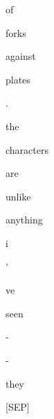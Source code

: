 \documentclass[varwidth=150mm]{standalone}
\begin{document}
\begin{CJK*}{UTF8}{gbsn}
{{{\colorbox{red!1.964485764503479}{\strut of} \colorbox{red!47.36729431152344}{\strut forks} \colorbox{red!2.4513847827911377}{\strut against} \colorbox{red!66.5539321899414}{\strut plates} \colorbox{red!0.0}{\strut .} \colorbox{red!4.719942092895508}{\strut the} \colorbox{red!12.691497802734375}{\strut characters} \colorbox{red!8.424782752990723}{\strut are} \colorbox{red!2.6136229038238525}{\strut unlike} \colorbox{red!0.0}{\strut anything} \colorbox{red!7.486433506011963}{\strut i} \colorbox{red!0.0}{\strut '} \colorbox{red!0.0}{\strut ve} \colorbox{red!10.282360076904297}{\strut seen} \colorbox{red!45.31434631347656}{\strut -} \colorbox{red!4.5782060623168945}{\strut -} \colorbox{red!14.930547714233398}{\strut they} \colorbox{red!2.1927897930145264}{\strut [SEP]}
}}}
\end{CJK*}
\end{document}

